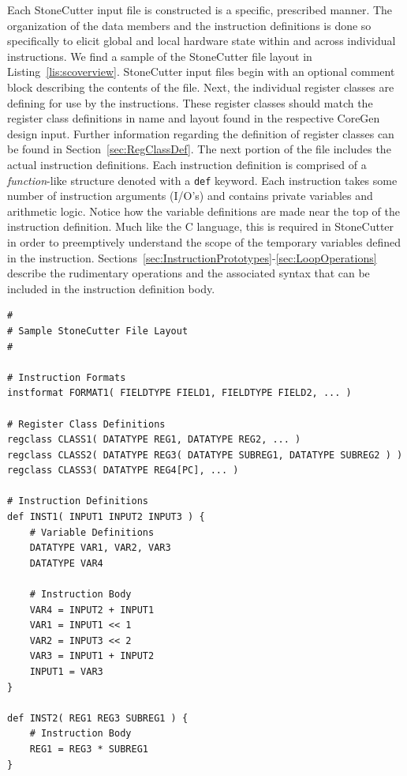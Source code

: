 \documentclass{article}
\begin{document}
Each StoneCutter input file is constructed is a specific, prescribed manner.  The organization of the data members and 
the instruction definitions is done so specifically to elicit global and local hardware state within and across individual instructions.  
We find a sample of the StoneCutter file layout in Listing~\ref{lis:scoverview}.  
StoneCutter input files begin with an optional comment block describing the contents of the file.  Next, the individual register 
classes are defining for use by the instructions.  These register classes should match the register class definitions in name and 
layout found in the respective CoreGen design input.  Further information regarding the definition of register classes can 
be found in Section~\ref{sec:RegClassDef}.  The next portion of the file includes the actual instruction definitions.  Each 
instruction definition is comprised of a \textit{function}-like structure denoted with a \texttt{def} keyword.  Each instruction 
takes some number of instruction arguments (I/O's) and contains private variables and arithmetic logic.  Notice how 
the variable definitions are made near the top of the instruction definition.  Much like the C language, this is required 
in StoneCutter in order to preemptively understand the scope of the temporary variables defined in the instruction.  
Sections~\ref{sec:InstructionPrototypes}-\ref{sec:LoopOperations} 
describe the rudimentary operations and the associated syntax that can be included in the instruction 
definition body.  

\clearpage
\vspace{0.125in}
\begin{lstlisting}[frame=single,style=base,caption={StoneCutter File Structure},captionpos=b,label={lis:scoverview}]
#
# Sample StoneCutter File Layout
#

# Instruction Formats
instformat FORMAT1( FIELDTYPE FIELD1, FIELDTYPE FIELD2, ... )

# Register Class Definitions
regclass CLASS1( DATATYPE REG1, DATATYPE REG2, ... )
regclass CLASS2( DATATYPE REG3( DATATYPE SUBREG1, DATATYPE SUBREG2 ) )
regclass CLASS3( DATATYPE REG4[PC], ... )

# Instruction Definitions
def INST1( INPUT1 INPUT2 INPUT3 ) {
	# Variable Definitions
	DATATYPE VAR1, VAR2, VAR3
	DATATYPE VAR4
	
	# Instruction Body
	VAR4 = INPUT2 + INPUT1
	VAR1 = INPUT1 << 1
	VAR2 = INPUT3 << 2
	VAR3 = INPUT1 + INPUT2
	INPUT1 = VAR3
}

def INST2( REG1 REG3 SUBREG1 ) {
	# Instruction Body
	REG1 = REG3 * SUBREG1
}
\end{lstlisting}
\end{document}
